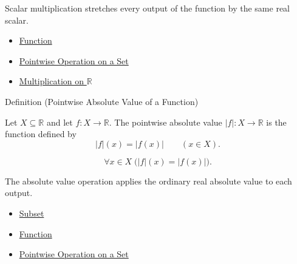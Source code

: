 \begin{remark*}[Interpretation]
Scalar multiplication stretches every output of the function by the same
real scalar.
\end{remark*}

\begin{dependencies}
\begin{itemize}
  \item \hyperref[def:function]{Function}
  \item \hyperref[def:pointwise-operation-on-set]{Pointwise Operation on a Set}
  \item \hyperref[def:multiplication-on-r]{Multiplication on $\mathbb{R}$}
\end{itemize}
\end{dependencies}

\begin{definitionbox}{Definition (Pointwise Absolute Value of a Function)}
\begin{definition}
\label{def:pointwise-absolute-value-of-a-function}
Let $X\subseteq\mathbb{R}$ and let $f:X\to\mathbb{R}$.  The pointwise
absolute value $|f|:X\to\mathbb{R}$ is the function defined by
\[
  |f|(x)=|f(x)|
  \qquad (x\in X).
\]
\end{definition}
\end{definitionbox}

\begin{remark*}
\[
  \forall x\in X\;\bigl(|f|(x)=|f(x)|\bigr).
\]
\end{remark*}

\begin{remark*}[Interpretation]
The absolute value operation applies the ordinary real absolute value to
each output.
\end{remark*}

\begin{dependencies}
\begin{itemize}
  \item \hyperref[def:subset]{Subset}
  \item \hyperref[def:function]{Function}
  \item \hyperref[def:pointwise-operation-on-set]{Pointwise Operation on a Set}
\end{itemize}
\end{dependencies}

